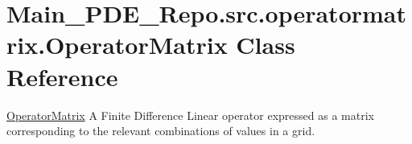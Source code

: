 \hypertarget{classMain__PDE__Repo_1_1src_1_1operatormatrix_1_1OperatorMatrix}{}\section{Main\+\_\+\+P\+D\+E\+\_\+\+Repo.\+src.\+operatormatrix.\+Operator\+Matrix Class Reference}
\label{classMain__PDE__Repo_1_1src_1_1operatormatrix_1_1OperatorMatrix}


\hyperlink{classMain__PDE__Repo_1_1src_1_1operatormatrix_1_1OperatorMatrix}{Operator\+Matrix} A Finite Difference Linear operator expressed as a matrix corresponding to the relevant combinations of values in a grid.  


